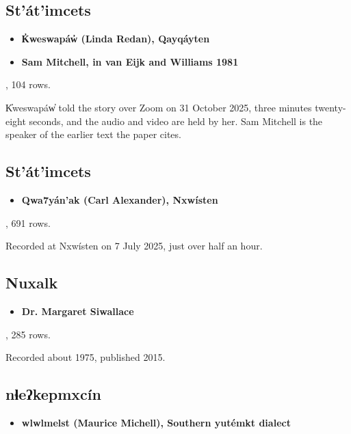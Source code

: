 \subsection{St'át'imcets}

\begin{itemize}
\item \textbf{K̓weswapáw̓ (Linda Redan), Qayqáyten}
\item \textbf{Sam Mitchell, in van Eijk and Williams 1981}
\end{itemize}

\cite{src:Matthewson-and-Redan-2026}, 104 rows.

K̓weswapáw̓ told the story over Zoom on 31 October 2025, three minutes twenty-eight seconds, and the audio and video are held by her. Sam Mitchell is the speaker of the earlier text the paper cites.

\subsection{St'át'imcets}

\begin{itemize}
\item \textbf{Qwa7yán'ak (Carl Alexander), Nxwísten}
\end{itemize}

\cite{src:Alexander-and-Davis-2026}, 691 rows.

Recorded at Nxwísten on 7 July 2025, just over half an hour.

\subsection{Nuxalk}

\begin{itemize}
\item \textbf{Dr. Margaret Siwallace}
\end{itemize}

\cite{src:Nater-2015}, 285 rows.

Recorded about 1975, published 2015.

\subsection{nɬeʔkepmxcín}

\begin{itemize}
\item \textbf{wlwlmelst (Maurice Michell), Southern yutémkt dialect}
\end{itemize}

